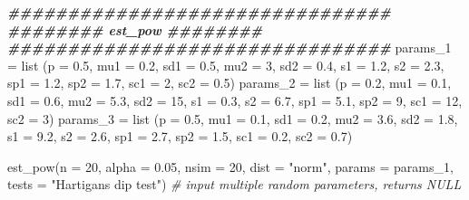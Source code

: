 \documentclass[
]{article}
\newenvironment{Shaded}{\begin{snugshade}}{\end{snugshade}}
\newcommand{\AttributeTok}[1]{\textcolor[rgb]{0.77,0.63,0.00}{#1}}
\newcommand{\CommentTok}[1]{\textcolor[rgb]{0.56,0.35,0.01}{\textit{#1}}}
\newcommand{\DecValTok}[1]{\textcolor[rgb]{0.00,0.00,0.81}{#1}}
\newcommand{\DocumentationTok}[1]{\textcolor[rgb]{0.56,0.35,0.01}{\textbf{\textit{#1}}}}
\newcommand{\FloatTok}[1]{\textcolor[rgb]{0.00,0.00,0.81}{#1}}
\newcommand{\FunctionTok}[1]{\textcolor[rgb]{0.00,0.00,0.00}{#1}}
\newcommand{\NormalTok}[1]{#1}
\newcommand{\OtherTok}[1]{\textcolor[rgb]{0.56,0.35,0.01}{#1}}
\newcommand{\StringTok}[1]{\textcolor[rgb]{0.31,0.60,0.02}{#1}}
\begin{document}
\begin{Shaded}
\begin{Highlighting}[]
\DocumentationTok{\#\#\#\#\#\#\#\#\#\#\#\#\#\#\#\#\#\#\#\#\#\#\#\#\#\#\#\#\#\#\#\#}
\DocumentationTok{\#\#\#\#\#\#\#\# est\_pow \#\#\#\#\#\#\#\#}
\DocumentationTok{\#\#\#\#\#\#\#\#\#\#\#\#\#\#\#\#\#\#\#\#\#\#\#\#\#\#\#\#\#\#\#\#}
\NormalTok{params\_1 }\OtherTok{=} \FunctionTok{list}\NormalTok{ (}\AttributeTok{p =} \FloatTok{0.5}\NormalTok{, }\AttributeTok{mu1 =} \FloatTok{0.2}\NormalTok{, }\AttributeTok{sd1 =} \FloatTok{0.5}\NormalTok{, }\AttributeTok{mu2 =} \DecValTok{3}\NormalTok{, }\AttributeTok{sd2 =} \FloatTok{0.4}\NormalTok{, }\AttributeTok{s1 =} \FloatTok{1.2}\NormalTok{, }\AttributeTok{s2 =} \FloatTok{2.3}\NormalTok{, }\AttributeTok{sp1 =} \FloatTok{1.2}\NormalTok{, }\AttributeTok{sp2 =} \FloatTok{1.7}\NormalTok{, }\AttributeTok{sc1 =} \DecValTok{2}\NormalTok{, }\AttributeTok{sc2 =} \FloatTok{0.5}\NormalTok{)}
\NormalTok{params\_2 }\OtherTok{=} \FunctionTok{list}\NormalTok{ (}\AttributeTok{p =} \FloatTok{0.2}\NormalTok{, }\AttributeTok{mu1 =} \FloatTok{0.1}\NormalTok{, }\AttributeTok{sd1 =} \FloatTok{0.6}\NormalTok{, }\AttributeTok{mu2 =} \FloatTok{5.3}\NormalTok{, }\AttributeTok{sd2 =} \DecValTok{15}\NormalTok{, }\AttributeTok{s1 =} \FloatTok{0.3}\NormalTok{, }\AttributeTok{s2 =} \FloatTok{6.7}\NormalTok{, }\AttributeTok{sp1 =} \FloatTok{5.1}\NormalTok{, }\AttributeTok{sp2 =} \DecValTok{9}\NormalTok{, }\AttributeTok{sc1 =} \DecValTok{12}\NormalTok{, }\AttributeTok{sc2 =} \DecValTok{3}\NormalTok{)}
\NormalTok{params\_3 }\OtherTok{=} \FunctionTok{list}\NormalTok{ (}\AttributeTok{p =} \FloatTok{0.5}\NormalTok{, }\AttributeTok{mu1 =} \FloatTok{0.1}\NormalTok{, }\AttributeTok{sd1 =} \FloatTok{0.2}\NormalTok{, }\AttributeTok{mu2 =} \FloatTok{3.6}\NormalTok{, }\AttributeTok{sd2 =} \FloatTok{1.8}\NormalTok{, }\AttributeTok{s1 =} \FloatTok{9.2}\NormalTok{, }\AttributeTok{s2 =} \FloatTok{2.6}\NormalTok{, }\AttributeTok{sp1 =} \FloatTok{2.7}\NormalTok{, }\AttributeTok{sp2 =} \FloatTok{1.5}\NormalTok{, }\AttributeTok{sc1 =} \FloatTok{0.2}\NormalTok{, }\AttributeTok{sc2 =} \FloatTok{0.7}\NormalTok{)}

\FunctionTok{est\_pow}\NormalTok{(}\AttributeTok{n =} \DecValTok{20}\NormalTok{, }\AttributeTok{alpha =} \FloatTok{0.05}\NormalTok{, }\AttributeTok{nsim =} \DecValTok{20}\NormalTok{, }\AttributeTok{dist =} \StringTok{"norm"}\NormalTok{, }\AttributeTok{params =}\NormalTok{ params\_1,  }\AttributeTok{tests =} \StringTok{"Hartigans\textquotesingle{} dip test"}\NormalTok{)  }\CommentTok{\# input multiple random parameters, returns NULL}
\end{Highlighting}
\end{Shaded}
\end{document}
